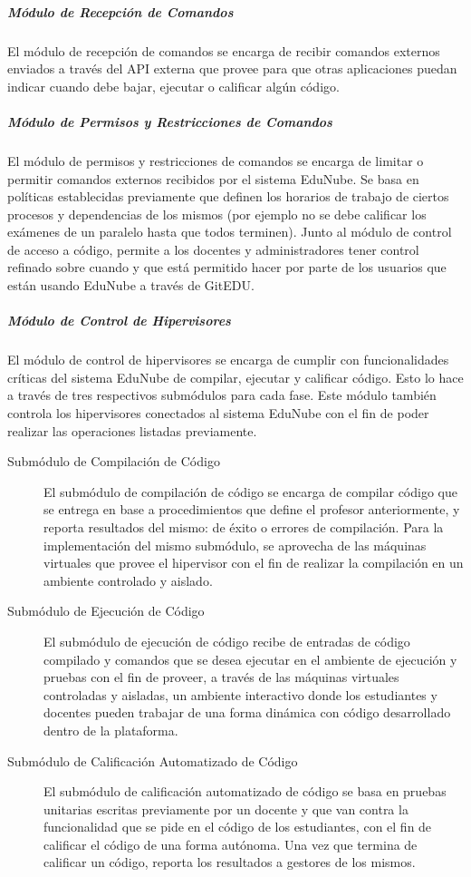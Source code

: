 \subparagraph{Módulo de Recepción de Comandos}
 
El módulo de recepción de comandos se encarga de recibir comandos externos enviados a través del API externa que provee para que otras aplicaciones puedan indicar cuando debe bajar, ejecutar o calificar algún código.

\subparagraph{Módulo de Permisos y Restricciones de Comandos}
 
El módulo de permisos y restricciones de comandos se encarga de limitar o permitir comandos externos recibidos por el sistema EduNube. Se basa en políticas establecidas previamente que definen los horarios de trabajo de ciertos procesos y dependencias de los mismos (por ejemplo no se debe calificar los exámenes de un paralelo hasta que todos terminen). Junto al módulo de control de acceso a código, permite a los docentes y administradores tener control refinado sobre cuando y que está permitido hacer por parte de los usuarios que están usando EduNube a través de GitEDU.

\subparagraph{Módulo de Control de Hipervisores}
 
El módulo de control de hipervisores se encarga de cumplir con funcionalidades críticas del sistema EduNube de compilar, ejecutar y calificar código. Esto lo hace a través de tres respectivos submódulos para cada fase. Este módulo también controla los hipervisores conectados al sistema EduNube con el fin de poder realizar las operaciones listadas previamente.
\begin{description}
	\item[Submódulo de Compilación de Código] 
	El submódulo de compilación de código se encarga de compilar código que se entrega en base a procedimientos que define el profesor anteriormente, y reporta resultados del mismo: de éxito o errores de compilación. Para la implementación del mismo submódulo, se aprovecha de las máquinas virtuales que provee el hipervisor con el fin de realizar la compilación en un ambiente controlado y aislado.
    \item[Submódulo de Ejecución de Código] 
	El submódulo de ejecución de código recibe de entradas de código compilado y comandos que se desea ejecutar en el ambiente de ejecución y pruebas con el fin de proveer, a través de las máquinas virtuales controladas y aisladas, un ambiente interactivo donde los estudiantes y docentes pueden trabajar de una forma dinámica con código desarrollado dentro de la plataforma.
    \item[Submódulo de Calificación Automatizado de Código] 
	El submódulo de calificación automatizado de código se basa en pruebas unitarias escritas previamente por un docente y que van contra la funcionalidad que se pide en el código de los estudiantes, con el fin de calificar el código de una forma autónoma. Una vez que termina de calificar un código, reporta los resultados a gestores de los mismos.
\end{description}

